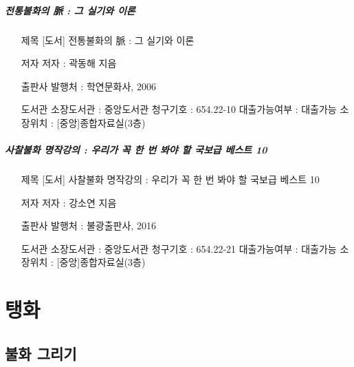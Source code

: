 \documentclass[12pt, a4paper, oneside]{book}
\let\stdsection\section
\renewcommand\section{\newpage\stdsection}
\begin{document}
\paragraph{ 전통불화의 脈 : 그 실기와 이론 }  

\begin{itemize}[					
		topsep=0.0em,			
		parsep=0.0em,			
		itemsep=0em,			
		leftmargin=	5	em,
		labelwidth=	1	em,			
		labelsep=		1	 em			
]					
	\item	[제목]	[도서] 전통불화의 脈 : 그 실기와 이론	\item	[저자]	저자 : 곽동해 지음	\item	[출판사]	발행처 : 학연문화사, 2006	\item	[도서관]	소장도서관 : 중앙도서관	청구기호 : 654.22-10	대출가능여부 : 대출가능	소장위치 : [중앙]종합자료실(3층)
\end{itemize}					


\paragraph{ 사찰불화 명작강의 : 우리가 꼭 한 번 봐야 할 국보급 베스트 10	 }

\begin{itemize}[					
		topsep=0.0em,			
		parsep=0.0em,			
		itemsep=0em,			
		leftmargin=	5	em,
		labelwidth=	1	em,			
		labelsep=		1	 em			
]					
	\item	[제목]	[도서] 사찰불화 명작강의 : 우리가 꼭 한 번 봐야 할 국보급 베스트 10	\item	[저자]	저자 : 강소연 지음	\item	[출판사]	발행처 : 불광출판사, 2016	\item	[도서관]	소장도서관 : 중앙도서관	청구기호 : 654.22-21	대출가능여부 : 대출가능	소장위치 : [중앙]종합자료실(3층)
\end{itemize}					




	\chapter{ 탱화 }
	\noptcrule

	\newpage	
	\minitoc


	\section{ 불화 그리기 }
\end{document}
